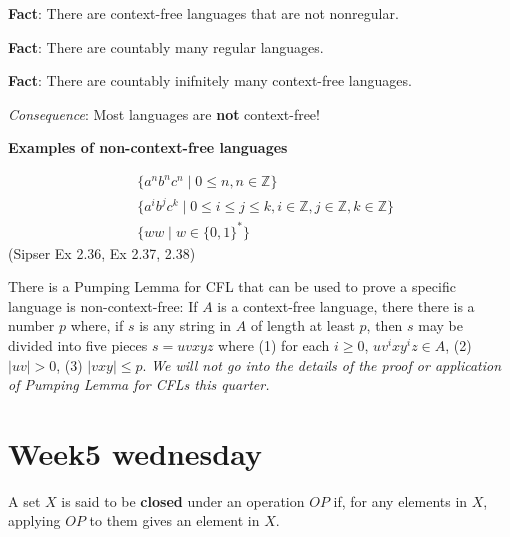 \documentclass[12pt, oneside]{article}
\begin{document}
{\bf Fact}: There are context-free languages that are not nonregular.

{\bf Fact}: There are countably many regular languages.

{\bf Fact}: There are countably inifnitely many context-free languages.

{\it Consequence}: Most languages are {\bf not} context-free!

{\bf Examples  of non-context-free languages}

\begin{align*}
    &\{ a^n b^n c^n \mid 0 \leq n , n \in \mathbb{Z}\}\\
    &\{ a^i b^j c^k \mid 0 \leq i \leq j \leq k , i \in \mathbb{Z}, j \in \mathbb{Z}, k \in \mathbb{Z}\}\\
    &\{ ww \mid w \in \{0,1\}^* \}
\end{align*}
(Sipser Ex 2.36, Ex 2.37, 2.38)

There is a Pumping Lemma for CFL that can be used to prove a specific language is non-context-free: 
If $A$ is a context-free language, there there
is a number $p$ where, if $s$ is any string in $A$ of length at least $p$, then $s$ may be divided 
into five pieces $s = uvxyz$ where (1) for each $i \geq 0$, $uv^ixy^iz \in A$, (2) $|uv|>0$, (3) $|vxy| \leq p$.
{\it We will not go into the details of the proof or application of Pumping Lemma for CFLs this quarter.}
 \vfill
\section*{Week5 wednesday}


    
A set $X$ is said to be {\bf closed} under an operation $OP$ if, for any elements in $X$, applying 
$OP$ to them gives an element in $X$.  
\end{document}
